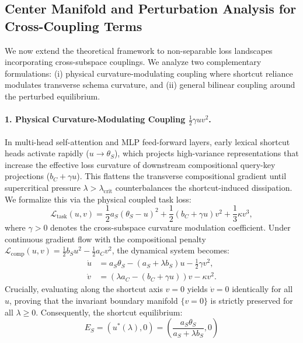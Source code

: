 \documentclass{article}
\theoremstyle{plain}
\theoremstyle{definition}
\begin{document}
\subsection{Center Manifold and Perturbation Analysis for Cross-Coupling Terms}
\label{sec:app_center_manifold}
We now extend the theoretical framework to non-separable loss landscapes incorporating cross-subspace couplings. We analyze two complementary formulations: (i) physical curvature-modulating coupling where shortcut reliance modulates transverse schema curvature, and (ii) general bilinear coupling around the perturbed equilibrium.

\paragraph{1. Physical Curvature-Modulating Coupling $\frac{1}{2}\gamma u v^2$.}
In multi-head self-attention and MLP feed-forward layers, early lexical shortcut heads activate rapidly ($u \to \theta_S$), which projects high-variance representations that increase the effective loss curvature of downstream compositional query-key projections ($b_C + \gamma u$). This flattens the transverse compositional gradient until supercritical pressure $\lambda > \lambda_{\text{crit}}$ counterbalances the shortcut-induced dissipation. We formalize this via the physical coupled task loss:
\begin{equation}
    \mathcal{L}_{\text{task}}(u, v) = \frac{1}{2} a_S (\theta_S - u)^2 + \frac{1}{2} (b_C + \gamma u) v^2 + \frac{1}{3} \kappa v^3,
\end{equation}
where $\gamma > 0$ denotes the cross-subspace curvature modulation coefficient. Under continuous gradient flow with the compositional penalty $\mathcal{L}_{\text{comp}}(u, v) = \frac{1}{2} b_S u^2 - \frac{1}{2} a_C v^2$, the dynamical system becomes:
\begin{align}
    \dot{u} &= a_S \theta_S - (a_S + \lambda b_S) u - \frac{1}{2} \gamma v^2, \label{eq:curv_coupled_u} \\
    \dot{v} &= \left(\lambda a_C - (b_C + \gamma u)\right) v - \kappa v^2. \label{eq:curv_coupled_v}
\end{align}
Crucially, evaluating along the shortcut axis $v = 0$ yields $\dot{v} = 0$ identically for all $u$, proving that the invariant boundary manifold $\{v = 0\}$ is strictly preserved for all $\lambda \ge 0$. Consequently, the shortcut equilibrium:
\begin{equation}
    E_S = (u^*(\lambda), 0) = \left( \frac{a_S \theta_S}{a_S + \lambda b_S}, 0 \right)
\end{equation}
\end{document}
